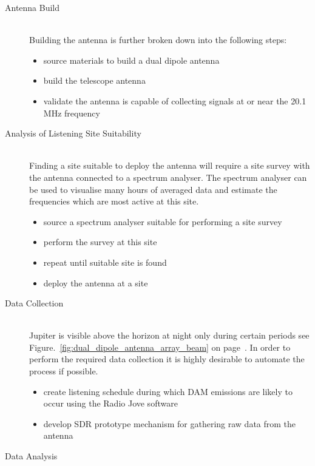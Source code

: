 \begin{description}
  \item[Antenna Build] \hfill \\
    Building the antenna is further broken down into the following steps:
    \begin{itemize}
      \item source materials to build a dual dipole antenna
      \item build the telescope antenna
      \item validate the antenna is capable of collecting signals at or near the 20.1 MHz frequency \\
    \end{itemize}
  \item [Analysis of Listening Site Suitability] \hfill \\
    Finding a site suitable to deploy the antenna will require a site survey with the antenna connected to a spectrum analyser. The spectrum analyser can be used to visualise many hours of averaged data and estimate the frequencies which are most active at this site.
    \begin{itemize}
      \item source a spectrum analyser suitable for performing a site survey
      \item perform the survey at this site
      \item repeat until suitable site is found 
      \item deploy the antenna at a site \\
    \end{itemize}
  \item [Data Collection] \hfill \\
    Jupiter is visible above the horizon at night only during certain periods see Figure.~\ref{fig:dual_dipole_antenna_array_beam} on page~\pageref{fig:dual_dipole_antenna_array_beam}. In order to perform the required data collection it is highly desirable to automate the process if possible.
    \begin{itemize}
      \item create listening schedule during which \gls{DAM} emissions are likely to occur using the Radio Jove software
      \item develop \gls{SDR} prototype mechanism for gathering raw data from the antenna\\
    \end{itemize}
  \item [Data Analysis] \hfill \\

\end{description}
